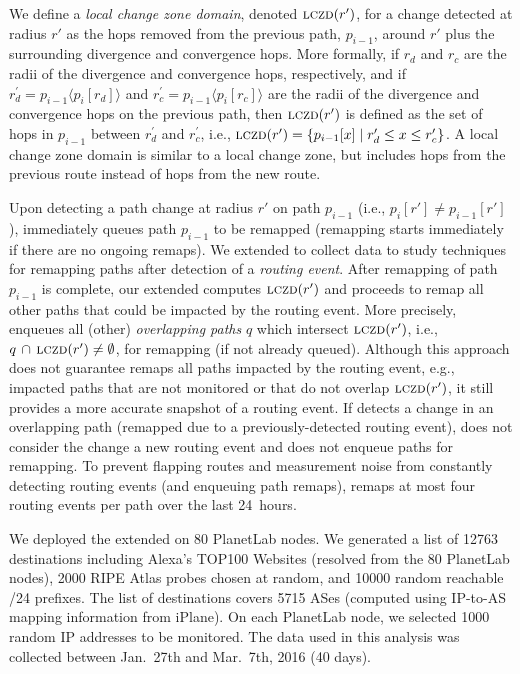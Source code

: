 We define a \emph{local change zone domain}, denoted $\mathrm{\textsc{lczd}}(r')$,
for a change detected at radius $r'$ as the hops removed from the
previous path, $p_{i-1}$, around $r'$ plus the surrounding
divergence and convergence hops.  More formally, if $r_d$ and $r_c$
are the radii of the divergence and convergence hops, respectively,
and if $r^\prime_d = p_{i-1}\langle p_i[r_d]\rangle$ and $r^\prime_c
= p_{i-1}\langle p_i[r_c]\rangle$ are the radii of the divergence
and convergence hops on the previous path, then $\mathrm{\textsc{lczd}}(r')$ is
defined as the set of hops in $p_{i-1}$ between $r^\prime_d$ and
$r^\prime_c$, i.e., $\mathrm{\textsc{lczd}}(r') = \{p_{i-1}[x] \mid{} r^\prime_d \le
x \le r^\prime_c\}$.  A local change zone domain is similar to
a local change zone, but includes hops from the previous route
instead of hops from the new route.

  Upon detecting a path change at radius $r'$
on path $p_{i-1}$ (i.e., $p_i[r'] \ne p_{i-1}[r']$), \dtrack{}
immediately queues path $p_{i-1}$ to be remapped (remapping starts
immediately if there are no ongoing remaps).  We extended \dtrack{}
to collect data to study techniques for remapping paths after
detection of a \emph{routing event}.  After remapping of path
$p_{i-1}$ is complete, our extended \dtrack{} computes $\mathrm{\textsc{lczd}}(r')$
and proceeds to remap all other paths that could be impacted by the
routing event.  More precisely, \dtrack{} enqueues all (other)
\emph{overlapping paths} $q$ which intersect $\mathrm{\textsc{lczd}}(r')$, i.e., $q\,
\cap\,\mathrm{\textsc{lczd}}(r') \ne \emptyset$, for remapping (if not already
queued).  Although this approach does not guarantee \dtrack{} remaps
all paths impacted by the routing event, e.g., impacted paths that
are not monitored or that do not overlap $\mathrm{\textsc{lczd}}(r')$, it still
provides a more accurate snapshot of a routing event.  If \dtrack{}
detects a change in an overlapping path (remapped due to
a previously-detected routing event), \dtrack{} does not consider
the change a new routing event and does not enqueue paths for
remapping.  To prevent flapping routes and measurement noise from
constantly detecting routing events (and enqueuing path remaps),
\dtrack{} remaps at most four routing events per path over the last
24~hours.

We deployed the extended \dtrack{} on 80 PlanetLab nodes. We
generated a list of 12763 destinations including Alexa's TOP100
Websites (resolved from the 80 PlanetLab nodes), 2000 RIPE Atlas
probes chosen at random, and 10000 random reachable /24 prefixes.
The list of destinations covers 5715 ASes (computed using IP-to-AS
mapping information from iPlane). On each PlanetLab node, we
selected 1000 random IP addresses to be monitored.  The data used in
this analysis was collected between Jan.~27th and Mar.~7th, 2016 (40
days).

